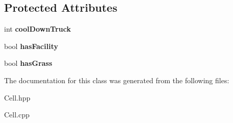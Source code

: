 \subsection*{Protected Attributes}
\begin{DoxyCompactItemize}
\item 
\mbox{\label{class_cell_aa02de60afb7ad5f7af6631a43441240c}} 
int {\bfseries cool\+Down\+Truck}
\item 
\mbox{\label{class_cell_ad2e8fc640495c2dd84dc7829fb95e133}} 
bool {\bfseries has\+Facility}
\item 
\mbox{\label{class_cell_acce93f79031e71b72ca8960407830d00}} 
bool {\bfseries has\+Grass}
\end{DoxyCompactItemize}


The documentation for this class was generated from the following files\+:\begin{DoxyCompactItemize}
\item 
Cell.\+hpp\item 
Cell.\+cpp\end{DoxyCompactItemize}
